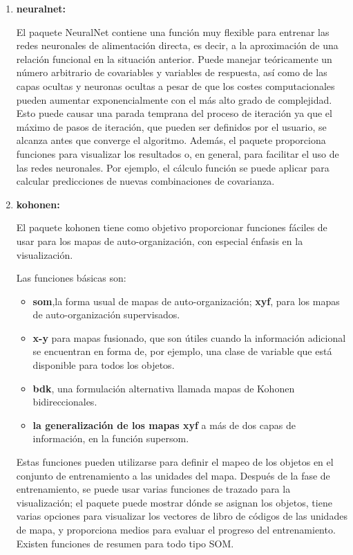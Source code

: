 \documentclass[journal]{IEEEtran}
\begin{document}
\begin{enumerate}
\item \textbf{neuralnet:}

El paquete NeuralNet contiene una función muy flexible para entrenar las redes neuronales de alimentación directa, es decir, a la aproximación de una relación funcional en la situación anterior. Puede manejar teóricamente un número arbitrario de covariables y variables de respuesta, así como de las capas ocultas y neuronas ocultas a pesar de que los costes computacionales pueden aumentar exponencialmente con el más alto grado de complejidad. Esto puede causar una parada temprana del proceso de iteración ya que el máximo de pasos de iteración, que pueden ser definidos por el usuario, se alcanza antes que converge el algoritmo. Además, el paquete proporciona funciones para visualizar los resultados o, en general, para facilitar el uso de las redes neuronales. Por ejemplo, el cálculo función se puede aplicar para calcular predicciones de nuevas combinaciones de covarianza.\\

\item \textbf{kohonen:}

El paquete kohonen tiene como objetivo proporcionar funciones fáciles de usar para los mapas de auto-organización, con especial énfasis en la visualización.

Las funciones básicas son:

\begin{itemize}
\item \textbf{som},la forma usual de mapas de auto-organización; \textbf{xyf}, para los mapas de auto-organización supervisados.

\item \textbf{x-y} para mapas fusionado, que son útiles cuando la información adicional se encuentran en forma de, por ejemplo, una clase de variable que está disponible para todos los objetos.

\item \textbf{bdk}, una formulación alternativa llamada mapas de Kohonen bidireccionales.

\item \textbf{la generalización de los mapas xyf} a más de dos capas de información, en la función supersom.
\end{itemize}

Estas funciones pueden utilizarse para definir el mapeo de los objetos en el conjunto de entrenamiento a las unidades del mapa. Después de la fase de entrenamiento, se puede usar varias funciones de trazado para la visualización; el paquete puede mostrar dónde se asignan los objetos, tiene varias opciones para visualizar los vectores de libro de códigos de las unidades de mapa, y proporciona medios para evaluar el progreso del entrenamiento. Existen funciones de resumen para todo tipo SOM.
\end{enumerate}
\end{document}
